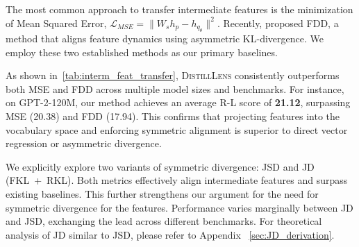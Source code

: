 \documentclass{article}
\theoremstyle{plain}
\theoremstyle{definition}
\theoremstyle{remark}
\begin{document}
The most common approach to transfer intermediate features is the minimization of Mean Squared Error, $\mathcal{L}_{MSE} = \|W_s h_p - h_{q_\theta}\|^2$. Recently, \citet{gong2025beyond} proposed FDD, a method that aligns feature dynamics using asymmetric KL-divergence. We employ these two established methods as our primary baselines.

As shown in~\cref{tab:interm_feat_transfer}, \textsc{DistillLens} consistently outperforms both MSE and FDD across multiple model sizes and benchmarks. For instance, on GPT-2-120M, our method achieves an average R-L score of \textbf{21.12}, surpassing MSE (20.38) and FDD (17.94). This confirms that projecting features into the vocabulary space and enforcing symmetric alignment is superior to direct vector regression or asymmetric divergence.

We explicitly explore two variants of symmetric divergence: JSD and JD (FKL~+~RKL). 
Both metrics effectively align intermediate features and surpass existing baselines. 
This further strengthens our argument for the need for symmetric divergence for the features. 
Performance varies marginally between JD and JSD, exchanging the lead across different benchmarks.
For theoretical analysis of JD similar to JSD, please refer to Appendix ~\cref{sec:JD_derivation}.


\end{document}
